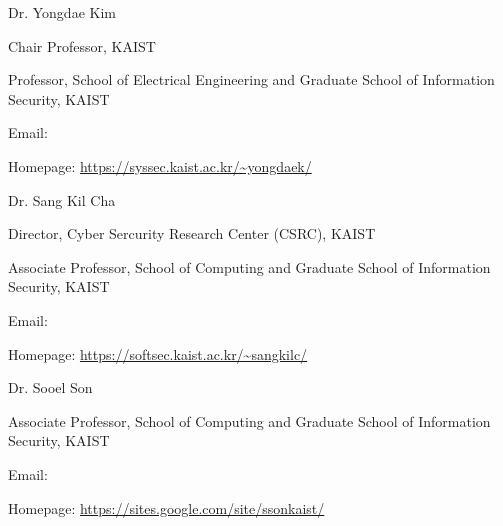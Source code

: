 \begin{timeitemize}{}{}
    \vspace{-1.0em}
\end{timeitemize}




\begin{timeitemize}{Dr. Yongdae Kim}{}
    \item Chair Professor, KAIST
    \item Professor, School of Electrical Engineering and Graduate School of Information Security, KAIST
    \item Email: 
    \item Homepage: \url{https://syssec.kaist.ac.kr/~yongdaek/}
\end{timeitemize}

\begin{timeitemize}{Dr. Sang Kil Cha}{}
    \item Director, Cyber Sercurity Research Center (CSRC), KAIST
    \item Associate Professor, School of Computing and Graduate School of Information Security, KAIST
    \item Email: 
    \item Homepage: \url{https://softsec.kaist.ac.kr/~sangkilc/}
\end{timeitemize}

\begin{timeitemize}{Dr. Sooel Son}{}
    \item Associate Professor, School of Computing and Graduate School of Information Security, KAIST
    \item Email: 
    \item Homepage: \url{https://sites.google.com/site/ssonkaist/}
\end{timeitemize}

